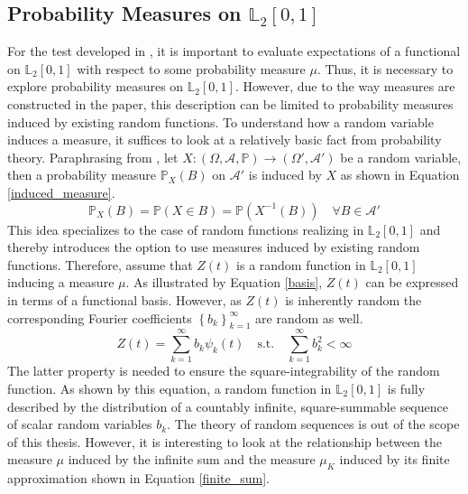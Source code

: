 \documentclass[12pt, a4paper]{article}
\theoremstyle{MAstyle} \newtheorem{assumption}{Assumption}[section]
\theoremstyle{MAstyle} \newtheorem{definition}{Definition}[section]
\theoremstyle{MAstyle} \newtheorem{theorem}{Theorem}[section]
\begin{document}
		\subsection{Probability Measures on $\mathbb{L}_2[0,1]$}\label{prob_measures_l2}
			For the test developed in \cite{bugni_permutation_2021}, it is important to evaluate expectations of a functional on $\mathbb{L}_2[0,1]$ with respect to some probability measure $\mu$. Thus, it is necessary to explore probability measures on $\mathbb{L}_2[0,1]$. However, due to the way measures are constructed in the paper, this description can be limited to probability measures induced by existing random functions. 
			To understand how a random variable induces a measure, it suffices to look at a relatively basic fact from probability theory. Paraphrasing from \cite{bauer_probability_2011}, let $X:\left(\Omega, \mathcal{A}, \mathbb{P}\right) \rightarrow \left(\Omega', \mathcal{A}'\right)$ be a random variable, then a probability measure $\mathbb{P}_X(B)$ on $\mathcal{A}'$ is induced by $X$ as shown in Equation \ref{induced_measure}.
			\begin{equation}\label{induced_measure}
				\mathbb{P}_X(B) = \mathbb{P}(X \in B) = \mathbb{P}(X^{-1}(B)) \quad \forall B \in \mathcal{A}'
			\end{equation}
			This idea specializes to the case of random functions realizing in $\mathbb{L}_2[0,1]$ and thereby introduces the option to use measures induced by existing random functions.
			Therefore, assume that $Z(t)$ is a random function in $\mathbb{L}_2[0,1]$ inducing a measure $\mu$. As illustrated by Equation \ref{basis}, $Z(t)$ can be expressed in terms of a functional basis. However, as $Z(t)$ is inherently random the corresponding Fourier coefficients $\left\{b_k\right\}_{k = 1}^{\infty}$ are random as well.
			\begin{equation}
				Z(t) = \sum_{k = 1}^{\infty} b_k \psi_k(t) \quad \text{s.t.} \quad \sum_{k = 1}^{\infty} b_k^2 < \infty
			\end{equation}
			The latter property is needed to ensure the square-integrability of the random function. As shown by this equation, a random function in $\mathbb{L}_2[0,1]$ is fully described by the distribution of a countably infinite, square-summable sequence of scalar random variables $b_k$. The theory of random sequences is out of the scope of this thesis. However, it is interesting to look at the relationship between the measure $\mu$ induced by the infinite sum and the measure $\mu_K$ induced by its finite approximation shown in Equation \ref{finite_sum}.
\end{document}
